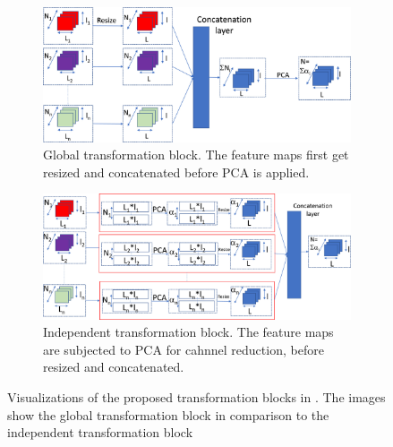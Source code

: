 \begin{figure}[htbp]
    \captionsetup[subfigure]{justification=centering}
    \centering
    \begin{subfigure}[b]{0.4\textwidth} %
        \centering
        \includegraphics[width=\textwidth]{figures/global_transformation_block.jpg}
        \caption{Global transformation block. The feature maps first get resized and concatenated before PCA is applied.}
        \label{fig:GTBheller}
    \end{subfigure}
    \hspace{0.05\textwidth} %
    \begin{subfigure}[b]{0.4\textwidth} %
        \centering
        \includegraphics[width=\textwidth]{figures/independent_transformation_block.jpg}
        \caption{Independent transformation block. The feature maps are subjected to PCA for cahnnel reduction, before resized and concatenated.}
        \label{fig:ITBheller}
    \end{subfigure}
    
    \caption{Visualizations of the proposed transformation blocks in \cite{EnsembleHeller2023}. The images show the global transformation 
             block in comparison to the independent transformation block \cite{EnsembleHeller2023}}
    \label{fig:hellerensembleblocks}
\end{figure}




